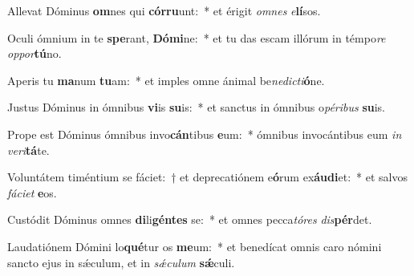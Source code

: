 \item Allevat Dóminus \textbf{om}nes qui \textbf{cór}\textbf{ru}unt:~* et érigit \textit{om}\textit{nes} \textit{e}\textbf{lí}sos.
\item Oculi ómnium in te \textbf{spe}rant, \textbf{Dó}\textbf{mi}ne:~* et tu das escam illórum in témpo\textit{re} \textit{op}\textit{por}\textbf{tú}no.
\item Aperis tu \textbf{ma}num \textbf{tu}am:~* et imples omne ánimal be\textit{ne}\textit{dic}\textit{ti}\textbf{ó}ne.
\item Justus Dóminus in ómnibus \textbf{vi}is \textbf{su}is:~* et sanctus in ómnibus o\textit{pé}\textit{ri}\textit{bus} \textbf{su}is.
\item Prope est Dóminus ómnibus invo\textbf{cán}tibus \textbf{e}um:~* ómnibus invocántibus eum \textit{in} \textit{ve}\textit{ri}\textbf{tá}te.
\item Voluntátem timéntium se fáciet:~† et deprecatiónem e\textbf{ó}rum ex\textbf{áu}\textbf{di}et:~* et salvos \textit{fá}\textit{ci}\textit{et} \textbf{e}os.
\item Custódit Dóminus omnes \textbf{di}li\textbf{gén}\textbf{tes} se:~* et omnes pecca\textit{tó}\textit{res} \textit{dis}\textbf{pér}det.
\item Laudatiónem Dómini lo\textbf{qué}tur os \textbf{me}um:~* et benedícat omnis caro nómini sancto ejus in sǽculum, et in \textit{sǽ}\textit{cu}\textit{lum} \textbf{sǽ}culi.
